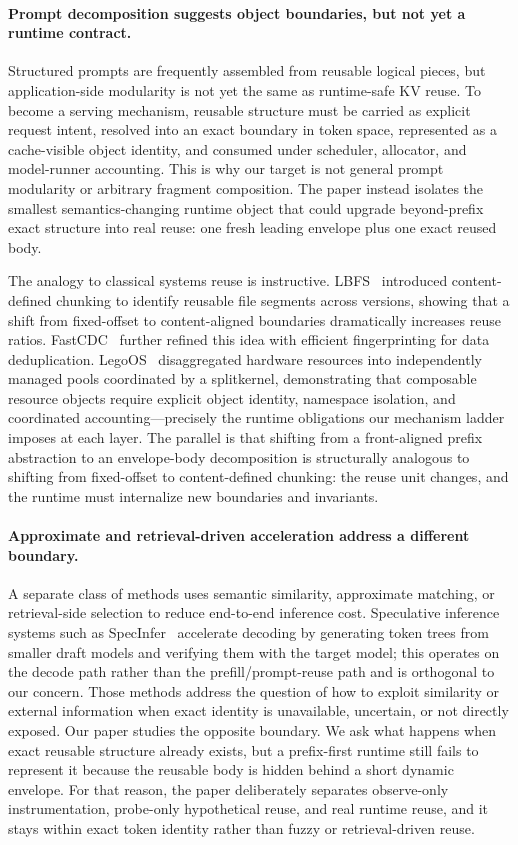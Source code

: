 \documentclass[conference]{IEEEtran}
\begin{document}
\paragraph{Prompt decomposition suggests object boundaries, but not yet a runtime contract.}
Structured prompts are frequently assembled from reusable logical pieces, but application-side modularity is not yet the same as runtime-safe KV reuse. To become a serving mechanism, reusable structure must be carried as explicit request intent, resolved into an exact boundary in token space, represented as a cache-visible object identity, and consumed under scheduler, allocator, and model-runner accounting. This is why our target is not general prompt modularity or arbitrary fragment composition. The paper instead isolates the smallest semantics-changing runtime object that could upgrade beyond-prefix exact structure into real reuse: one fresh leading envelope plus one exact reused body.

The analogy to classical systems reuse is instructive. LBFS~\cite{muthitacharoen2001lbfs} introduced content-defined chunking to identify reusable file segments across versions, showing that a shift from fixed-offset to content-aligned boundaries dramatically increases reuse ratios. FastCDC~\cite{xia2016fastcdc} further refined this idea with efficient fingerprinting for data deduplication. LegoOS~\cite{shan2018legoos} disaggregated hardware resources into independently managed pools coordinated by a splitkernel, demonstrating that composable resource objects require explicit object identity, namespace isolation, and coordinated accounting---precisely the runtime obligations our mechanism ladder imposes at each layer. The parallel is that shifting from a front-aligned prefix abstraction to an envelope-body decomposition is structurally analogous to shifting from fixed-offset to content-defined chunking: the reuse unit changes, and the runtime must internalize new boundaries and invariants.

\paragraph{Approximate and retrieval-driven acceleration address a different boundary.}
A separate class of methods uses semantic similarity, approximate matching, or retrieval-side selection to reduce end-to-end inference cost. Speculative inference systems such as SpecInfer~\cite{miao2024specinfer} accelerate decoding by generating token trees from smaller draft models and verifying them with the target model; this operates on the decode path rather than the prefill/prompt-reuse path and is orthogonal to our concern. Those methods address the question of how to exploit similarity or external information when exact identity is unavailable, uncertain, or not directly exposed. Our paper studies the opposite boundary. We ask what happens when exact reusable structure already exists, but a prefix-first runtime still fails to represent it because the reusable body is hidden behind a short dynamic envelope. For that reason, the paper deliberately separates observe-only instrumentation, probe-only hypothetical reuse, and real runtime reuse, and it stays within exact token identity rather than fuzzy or retrieval-driven reuse.
\end{document}
